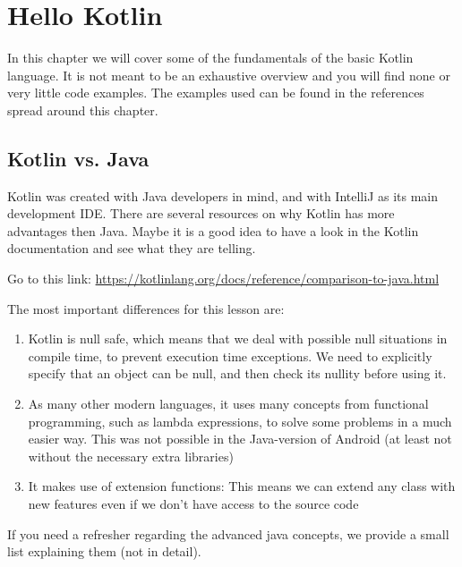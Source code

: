 
\chapter{Hello Kotlin}
In this chapter we will cover some of the fundamentals of the basic Kotlin language. It is not meant to be an exhaustive overview and you will find none or very little code examples. The examples used can be found in the references spread around this chapter. 

\section{Kotlin vs. Java}

Kotlin was created with Java developers in mind, and with IntelliJ as its main development
IDE. There are several resources on why Kotlin has more advantages then Java. Maybe it is a good idea to have a look in the Kotlin documentation and see what they are telling. 

Go to this link: \url{https://kotlinlang.org/docs/reference/comparison-to-java.html}

The most important differences for this lesson are:

\begin{enumerate}
	\item Kotlin is null safe, which means that we deal with possible null
	situations in compile time, to prevent execution time exceptions. We need to
	explicitly specify that an object can be null, and then check its nullity before
	using it.
	\item As many other modern languages, it uses many
	concepts from functional programming, such as lambda expressions, to solve
	some problems in a much easier way. This was not possible in the Java-version of Android (at least not without the necessary extra libraries)
	\item It makes use of extension functions: This means we can extend any class
	with new features even if we don’t have access to the source code
\end{enumerate}

If you need a refresher regarding the advanced java concepts, we provide a small list explaining them (not in detail).

